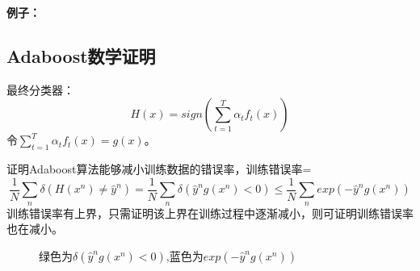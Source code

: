 \documentclass[UTF8]{ctexart} %
\begin{document}
			\textbf{例子：}
			\begin{figure}[H]
			\end{figure}
		\subsection{Adaboost数学证明}
			最终分类器：
			\[H(x) = sign(\sum_{t=1}^T\alpha_tf_t(x))\]	
			令$\sum_{t=1}^T\alpha_tf_t(x) = g(x)$。
			
			证明Adaboost算法能够减小训练数据的错误率，训练错误率=
			\[\frac{1}{N}\sum_n\delta(H(x^n)\neq\hat{y}^n) = \frac{1}{N}\sum_n\delta(\hat{y}^ng(x^n)<0)\leq
			\frac{1}{N}\sum_nexp(-\hat{y}^ng(x^n))\]
			训练错误率有上界，只需证明该上界在训练过程中逐渐减小，则可证明训练错误率也在减小。
			\begin{figure}[H]
				\caption{绿色为$\delta(\hat{y}^ng(x^n)<0)$,蓝色为$exp(-\hat{y}^ng(x^n))$ }
			\end{figure}
			
\end{document}

